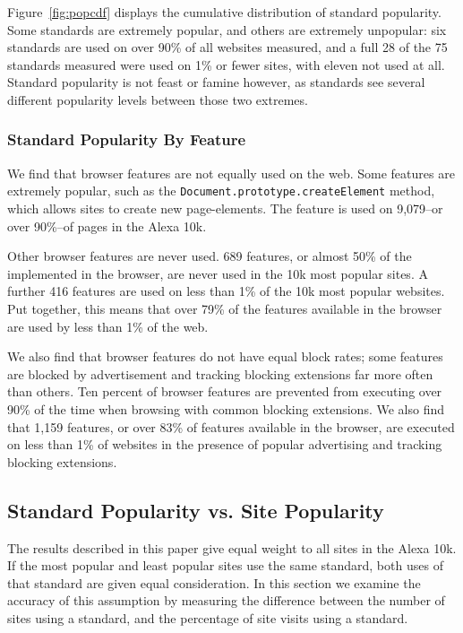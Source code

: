 Figure~\ref{fig:popcdf} displays the cumulative distribution of standard
popularity. Some standards are extremely popular, and others are extremely
unpopular: six standards are used on over 90\% of all websites
measured, and a full 28 of the 75 standards measured were used on 1\% or fewer
sites, with eleven not used at all. Standard popularity is not feast or famine
however, as standards see several different popularity levels between those two
extremes.


\subsubsection{Standard Popularity By Feature}
We find that browser features are not equally used on the web.  Some features
are extremely popular, such as the \texttt{Document.prototype.createElement}
method, which allows sites to create new page-elements.  The feature is
used on 9,079--or over 90\%--of pages in the Alexa 10k.

Other browser features are never used.  689 features, or almost
50\% of the \numfeatures implemented in the browser, are never used in the
10k most popular sites.  A further 416 features are used on less than 1\% of the
10k most popular websites.  Put together, this means that over 79\% of the
features available in the browser are used by less than 1\% of the web.

We also find that browser features do not have equal block rates; some features
are blocked by advertisement and tracking blocking extensions far more often
than others.  Ten percent of browser features are prevented from executing
over 90\% of the time when browsing with common blocking extensions.   We
also find that 1,159 features, or over 83\% of features available in the browser,
are executed on less than 1\% of websites in the presence of popular advertising
and tracking blocking extensions.


\subsection{Standard Popularity vs. Site Popularity}
\label{sec:results-feat-pop-by-site-pop}



The results described in this paper give equal weight to all sites in the Alexa 10k.
If the most popular and least popular sites use the same standard,
both uses of that standard are given equal consideration.  In this section
we examine the accuracy of this assumption by measuring the difference between
the number of sites using a standard, and the percentage of site visits using a standard.

